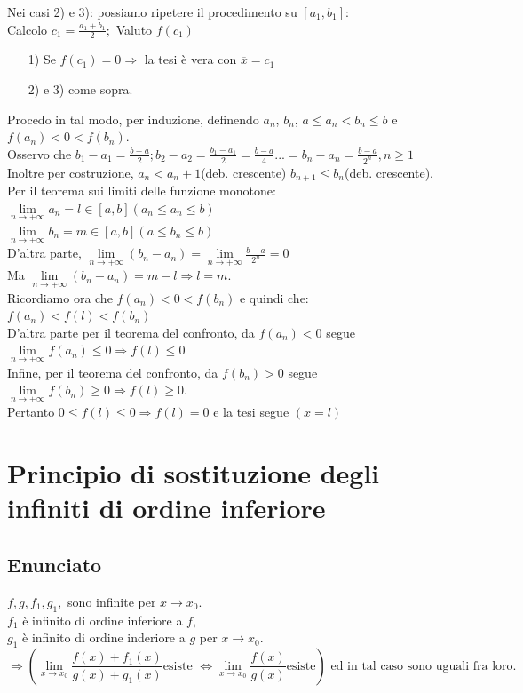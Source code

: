 \documentclass{article}
\newcommand{\vSpace}{\vspace{1em}}
\newcommand{\hSpace}{\hspace{1em}}
\begin{document}
\begin{flushleft}
Nei casi 2) e 3): possiamo ripetere il procedimento su $[a_1, b_1]$:\\
Calcolo $c_1 = \frac{a_1 + b_1}{2};$ Valuto $f(c_1)$\\
\begin{enumerate}
    \item[1)] Se $f(c_1) = 0 \Rightarrow$ la tesi è vera con $\overline{x} = c_1$\\
    \item[2)] e 3) come sopra. 
\end{enumerate}

Procedo in tal modo, per induzione, definendo $a_n$, $b_n$, $a \leq a_n < b_n \leq b$ e $f(a_n) < 0 < f(b_n)$.\\
Osservo che $b_1 - a_1 = \frac{b-a}{2}; b_2-a_2 = \frac{b_1-a_1}{2} = \frac{b-a}{4}...=b_n - a_n = \frac{b-a}{2^n}, n \geq 1$\\
Inoltre per costruzione, $a_n < a_n+1$(deb. crescente) $b_{n+1} \leq b_n$(deb. crescente).\\
Per il teorema sui limiti delle funzione monotone:\\
\hSpace $\lim\limits_{n \to + \infty}a_n = l \in [a,b] (a_n \leq a_n \leq b)$\\
\hSpace $\lim\limits_{n \to + \infty}b_n = m \in [a,b] (a \leq b_n \leq b)$\\
D'altra parte, $\lim\limits_{n \to + \infty}(b_n - a_n) = \lim\limits_{n \to + \infty}\frac{b-a}{2^n} = 0$\\
Ma $\lim\limits_{n \to + \infty} (b_n - a_n) = m - l \Rightarrow l = m$.\\
Ricordiamo ora che $f(a_n) < 0 < f(b_n)$ e quindi che: $f(a_n) < f(l) < f(b_n)$\\
\vSpace
D'altra parte per il teorema del confronto, da $f(a_n) < 0$ segue $\lim\limits_{n \to + \infty}f(a_n) \leq 0 \Rightarrow f(l) \leq 0$\\
Infine, per il teorema del confronto, da $f(b_n) > 0 $ segue $\lim\limits_{n \to + \infty}f(b_n) \geq 0 \Rightarrow f(l) \geq 0$.\\
Pertanto $0 \leq f(l) \leq 0 \Rightarrow f(l) = 0$ e la tesi segue $(\overline{x} = l)$

\section{Principio di sostituzione degli infiniti di ordine inferiore}
\subsection{Enunciato}
$f, g, f_1, g_1,$ sono infinite per $ x \to x_0$.\\
$f_1$ è infinito di ordine inferiore a $f$,\\
$g_1$ è infinito di ordine inderiore a $g$ per $x \to x_0$.
\[
\Rightarrow (\lim\limits_{x \to x_0}\frac{f(x)+f_1(x)}{g(x)+g_1(x)} \text{esiste } \iff \lim\limits_{x \to x_0}\frac{f(x)}{g(x)} \text{esiste})\text{ ed in tal caso sono uguali fra loro.}
\]

\end{flushleft}
\end{document}
